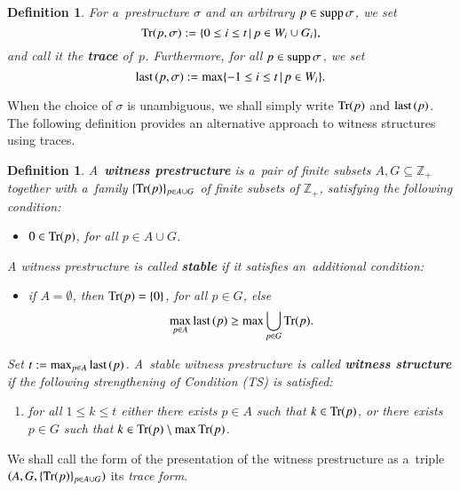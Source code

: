 \documentclass{amsart}[10pt]
\newtheorem{df}[theorem]{Definition}
\newcommand{\last}{\text{\rm last}\,}
\newcommand{\sm}{\setminus}
\newcommand{\supp}{\text{\rm supp}\,}
\newcommand{\trc}{{\text{\rm Tr}}}
\newcommand{\zz}{{\mathbb Z}}
\numberwithin{equation}{section}
\numberwithin{figure}{section}
\numberwithin{table}{section}
\begin{document}
\begin{df}\label{df:trc}
For a~prestructure $\sigma$ and an arbitrary $p\in\supp\sigma$, we set
\[\trc(p,\sigma):=\{0\leq i\leq t\,|\,p\in W_i\cup G_i\},\] 
and call it the {\bf trace} of~$p$. Furthermore, for all
$p\in\supp\sigma$, we set 
\[\last(p,\sigma):=\max\{-1\leq i\leq t\,|\,p\in W_i\}.\]
\end{df}

\nin When the choice of $\sigma$ is unambiguous, we shall simply write
$\trc(p)$ and $\last(p)$. The following definition provides an
alternative approach to witness structures using traces.

\begin{df}\label{df:trws}
A~{\bf witness prestructure} is a~pair of finite subsets
$A,G\subseteq\zz_+$ together with a~family $\{\trc(p)\}_{p\in A\cup
  G}$ of finite subsets of $\zz_+$, satisfying the following
condition:
\begin{itemize}
\item[(T)] $0\in\trc(p)$, for all $p\in A\cup G$.
\end{itemize}

\noindent
A witness prestructure is called {\bf stable} if it satisfies
an~additional condition:
\begin{itemize}
\item[(TS)] if $A=\emptyset$, then $\trc(p)=\{0\}$, for all $p\in G$,
else 
\[\max_{p\in A}\last(p)\geq\max\bigcup_{p\in G}\trc(p).\]
\end{itemize}

Set $t:=\max_{p\in A}\last(p)$. A~stable witness prestructure is
called {\bf witness structure} if the following strengthening of
Condition (TS) is satisfied:
\begin{enumerate}
\item[(TW)] {\it for all $1\leq k\leq t$ either there exists $p\in A$
  such that $k\in\trc(p)$, or there exists $p\in G$ such that
  $k\in\trc(p)\sm\max\trc(p)$.}
\end{enumerate}
\end{df}

We shall call the form of the presentation of the witness prestructure
as a~triple $(A,G,\{\trc(p)\}_{p\in A\cup G})$ its {\it trace form}.
\end{document}
